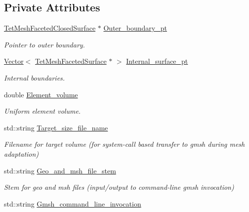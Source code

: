 \subsection*{Private Attributes}
\begin{DoxyCompactItemize}
\item 
\hyperlink{classoomph_1_1TetMeshFacetedClosedSurface}{Tet\+Mesh\+Faceted\+Closed\+Surface} $\ast$ \hyperlink{classoomph_1_1GmshParameters_a310ecaffe67e67b334aafaca82c4d50a}{Outer\+\_\+boundary\+\_\+pt}
\begin{DoxyCompactList}\small\item\em Pointer to outer boundary. \end{DoxyCompactList}\item 
\hyperlink{classoomph_1_1Vector}{Vector}$<$ \hyperlink{classoomph_1_1TetMeshFacetedSurface}{Tet\+Mesh\+Faceted\+Surface} $\ast$ $>$ \hyperlink{classoomph_1_1GmshParameters_aaa4afdde73a7fc67d5c2ba2976235381}{Internal\+\_\+surface\+\_\+pt}
\begin{DoxyCompactList}\small\item\em Internal boundaries. \end{DoxyCompactList}\item 
double \hyperlink{classoomph_1_1GmshParameters_aa7993da33a0468681e5f661ac5b00bfb}{Element\+\_\+volume}
\begin{DoxyCompactList}\small\item\em Uniform element volume. \end{DoxyCompactList}\item 
std\+::string \hyperlink{classoomph_1_1GmshParameters_ae2f3eabe211e22c18df2bf7b093bbdfb}{Target\+\_\+size\+\_\+file\+\_\+name}
\begin{DoxyCompactList}\small\item\em Filename for target volume (for system-\/call based transfer to gmsh during mesh adaptation) \end{DoxyCompactList}\item 
std\+::string \hyperlink{classoomph_1_1GmshParameters_a478a41ae94e177f02d38db90ea27d582}{Geo\+\_\+and\+\_\+msh\+\_\+file\+\_\+stem}
\begin{DoxyCompactList}\small\item\em Stem for geo and msh files (input/output to command-\/line gmsh invocation) \end{DoxyCompactList}\item 
std\+::string \hyperlink{classoomph_1_1GmshParameters_a5605a771916b353925ad55b6a6e914cb}{Gmsh\+\_\+command\+\_\+line\+\_\+invocation}

\end{DoxyCompactItemize}
